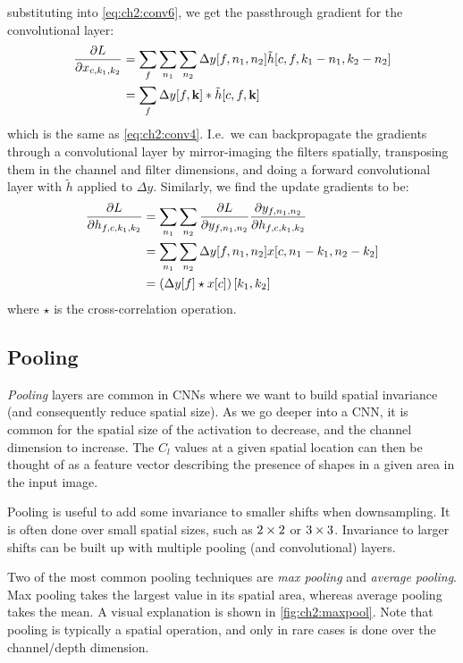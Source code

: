 substituting into \eqref{eq:ch2:conv6}, we get the passthrough gradient for the
convolutional layer:
\begin{align}
  \frac{\partial L}{\partial x_{c,k_1,k_2}} &= \sum_f \sum_{n_1} \sum_{n_2} \Delta y[f, n_1, n_2] \tilde{h}[c, f, k_1-n_1, k_2-n_2 ] \\
                          &= \sum_f \Delta y[f, \mathbf{k}] \ast \tilde{h}[c, f, \mathbf{k}] \label{eq:ch2:cnn_passthrough}
\end{align}
which is the same as \eqref{eq:ch2:conv4}. I.e.\ we can backpropagate the
gradients through a convolutional layer by mirror-imaging the filters spatially,
transposing them in the channel and filter dimensions, and doing a forward
convolutional layer with $\tilde{h}$ applied to $\Delta y$. Similarly, we
find the update gradients to be:
\begin{align}
  \frac{\partial L}{\partial h_{f,c,k_1,k_2}} &= \sum_{n_1} \sum_{n_2} \frac{\partial L}{\partial y_{f, n_1, n_2}} \frac{\partial y_{f, n_1, n_2}}{\partial h_{f, c, k_1, k_2}}  \\
                            &= \sum_{n_1} \sum_{n_2} \Delta y[f, n_1, n_2] x[c, n_1-k_1, n_2-k_2 ] \\
                            &= \left(\Delta y[f] \star x[c]\right)[k_1, k_2] \label{eq:ch2:cnn_weight_update}
\end{align}
where $\star$ is the cross-correlation operation.

\subsection{Pooling}
\emph{Pooling} layers are common in CNNs where we want to build spatial invariance (and consequently
reduce spatial size). As
we go deeper into a CNN, it is common for the spatial size of the activation to
decrease, and the channel dimension to increase. The $C_l$ values at a given
spatial location can then be thought of as a feature vector describing the
presence of shapes in a given area in the input image.

Pooling is useful to add some invariance to smaller shifts when downsampling. It
is often done over small spatial sizes, such as $2\times 2$ or $3\times 3$. Invariance
to larger shifts can be built up with multiple pooling (and convolutional) layers.

Two of the most common pooling techniques are \emph{max pooling} and
\emph{average pooling}. Max pooling takes the largest value in its spatial area,
whereas average pooling takes the mean. A visual explanation is shown in
\autoref{fig:ch2:maxpool}. Note that pooling is typically a spatial operation,
and only in rare cases is done over the channel/depth dimension.

